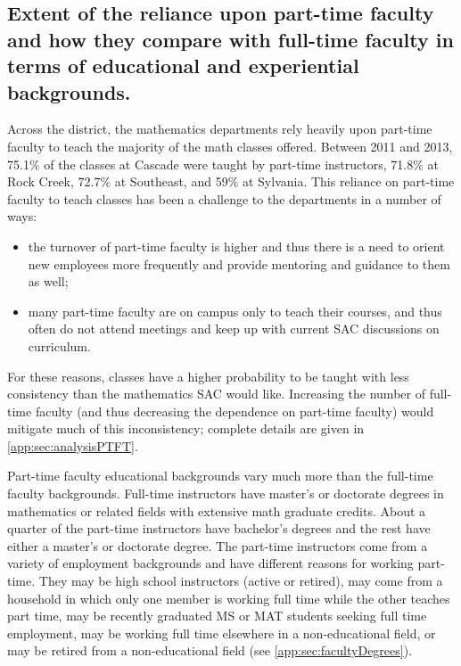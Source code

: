 \subsection[Part-time faculty]{Extent of the reliance upon part-time faculty and how they compare
	with full-time faculty in terms of educational and experiential backgrounds.}
Across the district, the mathematics departments rely heavily upon part-time faculty to teach the majority of the math classes offered.
Between 2011 and 2013, 75.1\% of the classes at Cascade were taught by part-time instructors, 71.8\% at Rock Creek, 72.7\% at Southeast, and 59\% at Sylvania.
This reliance on part-time faculty to teach classes has been a challenge to the departments in a number of ways:
\begin{itemize}
	\item the turnover of part-time faculty is higher and thus there is a need to orient new employees more frequently and provide mentoring and guidance to them as well;
	\item many part-time faculty are on campus only to teach their courses, and thus often do not attend meetings and keep up with current SAC discussions on curriculum.
\end{itemize}
For these reasons, classes have a higher probability to be taught with less consistency than the mathematics SAC would like.
Increasing the number of full-time faculty (and thus decreasing the dependence on part-time faculty) would mitigate much of this inconsistency; complete details are given in  \vref{app:sec:analysisPTFT}.

Part-time faculty educational backgrounds vary much more than the full-time faculty backgrounds.
Full-time instructors have master's or doctorate degrees in mathematics or related fields with extensive math graduate credits.
About a quarter of the part-time instructors have bachelor's degrees and the rest have either a master's or doctorate degree.
The part-time instructors come from a variety of employment backgrounds and have different reasons for working part-time.
They may be high school instructors (active or retired), may come from a household in which only one member is working full time while the other teaches part time, may be recently graduated MS or MAT students seeking full time employment, may be working full time elsewhere in a non-educational field, or may be retired from a non-educational field (see \vref{app:sec:facultyDegrees}).

